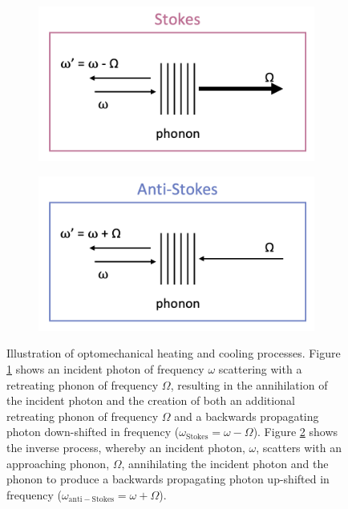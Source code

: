 \begin{figure}[t]
    \centering
    \begin{subfigure}[b]{0.49\textwidth}
        \centering
        \includegraphics[width=\textwidth]{figs/2-Cooling/StokesHeatingProcess.png}
        \caption{}
        \label{fig:Cooling:StokesHeating}
    \end{subfigure}
    \hfill
    \begin{subfigure}[b]{0.49\textwidth}
        \centering
        \includegraphics[width=\textwidth]{figs/2-Cooling/anti-StokesCoolingProcess.png}
        \caption{}
        \label{fig:Cooling:anti-StokesCooling}
    \end{subfigure}
    \caption{Illustration of optomechanical heating and cooling processes. Figure \ref{fig:Cooling:StokesHeating} shows an incident photon of frequency \(\omega\) scattering with a retreating phonon of frequency \(\Omega\), resulting in the annihilation of the incident photon and the creation of both an additional retreating phonon of frequency \(\Omega\) and a backwards propagating photon down-shifted in frequency (\(\omega_{\mathrm{Stokes}} = \omega - \Omega\)). Figure \ref{fig:Cooling:anti-StokesCooling} shows the inverse process, whereby an incident photon, \(\omega\), scatters with an approaching phonon, \(\Omega\), annihilating the incident photon and the phonon to produce a backwards propagating photon up-shifted in frequency (\(\omega_{\mathrm{anti-Stokes}} = \omega + \Omega\)).}
    \label{fig:Cooling:StokesProcesses}
\end{figure}

